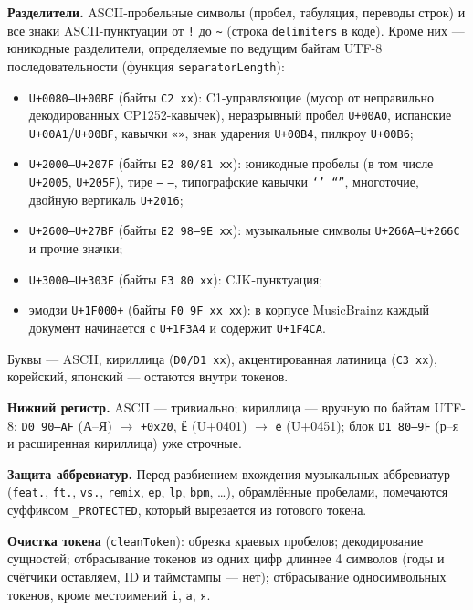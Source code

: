 \textbf{Разделители.} ASCII-пробельные символы (пробел, табуляция, переводы
строк) и все знаки ASCII-пунктуации от \texttt{!} до \texttt{\textasciitilde}
(строка \texttt{delimiters} в коде). Кроме них --- юникодные разделители,
определяемые по ведущим байтам UTF-8 последовательности (функция
\texttt{separatorLength}):

\begin{itemize}
    \item \texttt{U+0080--U+00BF} (байты \texttt{C2 xx}): C1-управляющие
    (мусор от неправильно декодированных CP1252-кавычек), неразрывный пробел
    \texttt{U+00A0}, испанские \texttt{U+00A1}/\texttt{U+00BF}, кавычки
    \texttt{«»}, знак ударения \texttt{U+00B4}, пилкроу \texttt{U+00B6};
    \item \texttt{U+2000--U+207F} (байты \texttt{E2 80/81 xx}): юникодные
    пробелы (в том числе \texttt{U+2005}, \texttt{U+205F}), тире \texttt{---}
    \texttt{--}, типографские кавычки \texttt{‘’ “”}, многоточие, двойную
    вертикаль \texttt{U+2016};
    \item \texttt{U+2600--U+27BF} (байты \texttt{E2 98--9E xx}): музыкальные
    символы \texttt{U+266A--U+266C} и прочие значки;
    \item \texttt{U+3000--U+303F} (байты \texttt{E3 80 xx}): CJK-пунктуация;
    \item эмодзи \texttt{U+1F000+} (байты \texttt{F0 9F xx xx}): в корпусе
    MusicBrainz каждый документ начинается с \texttt{U+1F3A4} и содержит
    \texttt{U+1F4CA}.
\end{itemize}

Буквы --- ASCII, кириллица (\texttt{D0/D1 xx}), акцентированная латиница
(\texttt{C3 xx}), корейский, японский --- остаются внутри токенов.

\textbf{Нижний регистр.} ASCII --- тривиально; кириллица --- вручную по байтам
UTF-8: \texttt{D0 90--AF} (А--Я) $\to$ \texttt{+0x20}, \texttt{Ё} (U+0401)
$\to$ \texttt{ё} (U+0451); блок \texttt{D1 80--9F} (р--я и расширенная
кириллица) уже строчные.

\textbf{Защита аббревиатур.} Перед разбиением вхождения музыкальных
аббревиатур (\texttt{feat.}, \texttt{ft.}, \texttt{vs.}, \texttt{remix},
\texttt{ep}, \texttt{lp}, \texttt{bpm}, \ldots), обрамлённые пробелами,
помечаются суффиксом \texttt{\_PROTECTED}, который вырезается из готового
токена.

\textbf{Очистка токена} (\texttt{cleanToken}): обрезка краевых пробелов;
декодирование сущностей; отбрасывание токенов из одних цифр длиннее 4 символов
(годы и счётчики оставляем, ID и таймстампы --- нет); отбрасывание
односимвольных токенов, кроме местоимений \texttt{i}, \texttt{a}, \texttt{я}.

